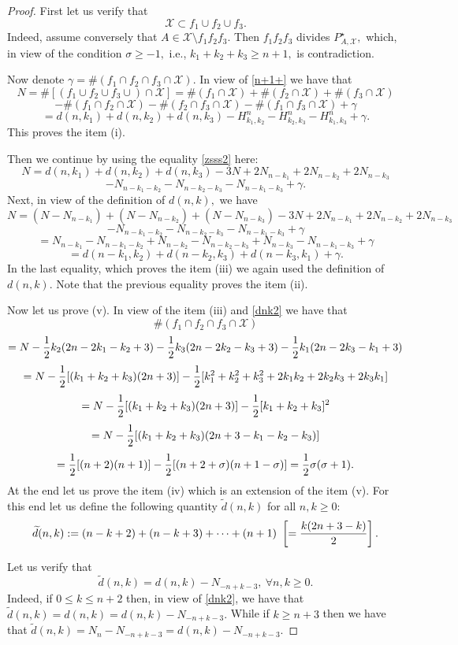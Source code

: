 \documentclass[a4paper,12pt]{article}
\theoremstyle{definition}
\numberwithin{equation}{section}
\numberwithin{figure}{section}
\newcommand{\Xset}{\mathcal{X}}
\begin{document}
\begin{proof}
First let us verify that 
\begin{equation}\label{n+1+}
	\Xset\subset f_1\cup f_2 \cup f_3. 
\end{equation} Indeed, assume conversely that $A\in \Xset\setminus f_1f_2f_3.$
Then $f_1f_2f_3$ divides $P^\star_{A,\Xset},$ which, in view of the condition $\sigma\ge -1,$ i.e., $k_1+k_2+k_3\ge n+1,$ is contradiction.

Now denote $\gamma=\#(f_1\cap f_2\cap f_3 \cap \Xset).$ 
In view of \eqref{n+1+} we have that
$$ N=\#[(f_1\cup f_2\cup f_3 \cup)\cap \Xset]=   \#(f_1 \cap \Xset)+ \#(f_2\cap \Xset)+ \#(f_3 \cap \Xset)$$ $$-
\#(f_1\cap f_2 \cap \Xset) - \#(f_2\cap f_3 \cap \Xset) - \#(f_1\cap f_3 \cap \Xset) +\gamma$$
$$=d(n,k_1)+d(n,k_2)+d(n,k_3)-H_{k_1,k_2}^n-H_{k_2,k_3}^n-H_{k_1,k_3}^n+\gamma.$$ This proves the item (i).

Then we continue by using the equality \eqref{zsss2} here:
$$N= d(n,k_1)+d(n,k_2)+d(n,k_3)-3N+2N_{n-k_1}+2N_{n-k_2}+2N_{n-k_3}$$ $$-N_{n-k_1-k_2}-N_{n-k_2-k_3}-N_{n-k_1-k_3}+\gamma.$$
Next, in view of the definition of $d(n,k),$ we have
$$N= (N-N_{n-k_1})+(N-N_{n-k_2})+(N-N_{n-k_3})-3N+2N_{n-k_1}+2N_{n-k_2}+2N_{n-k_3}$$
$$-N_{n-k_1-k_2}-N_{n-k_2-k_3}-N_{n-k_1-k_3}+\gamma$$ 
$$=N_{n-k_1}-N_{n-k_1-k_2}+N_{n-k_2}-N_{n-k_2-k_3}+N_{n-k_3}-N_{n-k_1-k_3}+\gamma$$
$$=d(n-k_1, k_2)+d(n-k_2,k_3)+d(n-k_3,k_1)+\gamma.$$
In the last equality, which proves the item (iii) we again used the definition of $d(n,k).$ Note that the previous equality proves the item (ii).

Now let us prove (v).
In view of the item (iii) and \eqref{dnk2} we have that
$$\#(f_1\cap f_2\cap f_3 \cap \Xset)$$ 
$$= N- {1\over 2} k_2(2n-2k_1-k_2+3)- {1\over 2} k_3(2n-2k_2-k_3+3)- {1\over 2} k_1(2n-2k_3-k_1+3)$$
$$= N-{1\over 2} [(k_1+k_2+k_3)(2n+3)]-{1\over 2}[k_1^2+k_2^2+k_3^2+2k_1k_2+2k_2k_3+2k_3k_1]$$ 
$$= N-{1\over 2} [(k_1+k_2+k_3)(2n+3)]-{1\over 2}[k_1+k_2+k_3]^2$$ 
$$= N-{1\over 2} [(k_1+k_2+k_3)(2n+3-k_1-k_2-k_3)]$$ 
$$= {1\over 2} [(n+2)(n+1)]-{1\over 2} [(n+2+\sigma)(n+1-\sigma)]= {1\over 2} \sigma(\sigma+1).$$ 
At the end let us prove the item (iv) which is an extension of the item (v).
For this end let us define the following quantity $\widetilde d(n,k)$ for all $n,k\ge 0:$ 
\begin{equation}\label{dnk3+}\widetilde d(n, k) := (n-k+2)+(n-k+3)+\cdots+(n+1)\ \left[={k(2n+3-k)\over 2}\right].\end{equation}

Let us verify that 
\begin{equation}\label{dnk3++}\widetilde d(n, k)=d(n,k)-N_{-n+k-3},\ \forall n,k\ge 0.\end{equation}
Indeed, if $0\le k\le n+2$ then, in view of \eqref{dnk2}, we have that $ \widetilde d(n, k)=d(n,k)=d(n,k)-N_{-n+k-3}.$
While if  $k\ge n+3$ then we have that $ \widetilde d(n, k)=N_n-N_{-n+k-3}=d(n,k)-N_{-n+k-3}.$


\end{proof}
\end{document}
